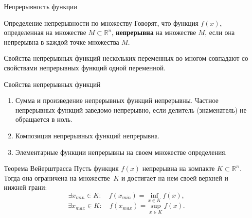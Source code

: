 \documentclass[8pt]{beamer}
\begin{document}
\begin{frame}{Непрерывность функции}
\begin{block}{Определение непрерывности по множеству}
Говорят, что функция $f(x)$, определенная на множестве $M\subset\mathbb{R}^n$, {\bf непрерывна} на множестве $M$, если она непрерывна в каждой точке множества  $M$.
\end{block}
\pause
Свойства непрерывных функций нескольких переменных во многом совпадают со свойствами непрерывных функций одной переменной.
\begin{block}{Свойства непрерывных функций}
\begin{enumerate}
\item Сумма и произведение непрерывных функций непрерывны. Частное непрерывных функций заведомо непрерывно, если делитель (знаменатель) не обращается в ноль.
\item Композиция непрерывных функций непрерывна.
\item Элементарные функции непрерывны на своем множестве определения.
\end{enumerate}
\end{block}
\pause
\begin{block}{Теорема Вейерштрасса}
Пусть функция $f(x)$ непрерывна на компакте $K\subset\mathbb{R}^n$. Тогда она ограничена на множестве~$K$ и достигает на нем своей верхней и нижней грани:
$$\exists x_{min}\in K:\quad f(x_{min}) = \inf_{x\in K}f(x),$$
$$\exists x_{max}\in K:\quad f(x_{max}) = \sup_{x\in K}f(x).$$
\end{block}
\end{frame}


\end{document}
